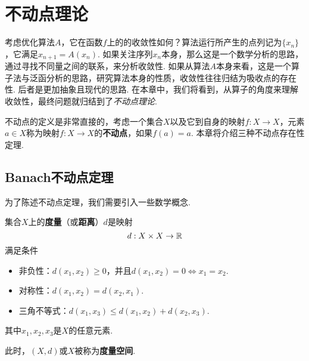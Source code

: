 \chapter{不动点理论}\label{chap:fixed-point-theory}

考虑优化算法$A$，它在函数$f$上的的收敛性如何？算法运行所产生的点列记为$\{x_n\}$，它满足$x_{n+1}=A(x_n)$. 如果关注序列$x_n$本身，那么这是一个数学分析的思路，通过寻找不同量之间的联系，来分析收敛性. 如果从算法$A$本身来看，这是一个算子法与泛函分析的思路，研究算法本身的性质，收敛性往往归结为吸收点的存在性. 后者是更加抽象且现代的思路. 在本章中，我们将看到，从算子的角度来理解收敛性，最终问题就归结到了\emph{不动点理论}. 

不动点的定义是非常直接的，考虑一个集合$X$以及它到自身的映射$f:X\to X$，元素$a\in X$称为映射$f:X\to X$的\textbf{不动点}，如果$f(a)=a$. 本章将介绍三种不动点存在性定理. 

\section{Banach不动点定理}
为了陈述不动点定理，我们需要引入一些数学概念. 

\begin{definition}[度量与度量空间]
集合$X$上的\textbf{度量}（或\textbf{距离}）$d$是映射
\[d:X\times X\to \mathbb{R}\]
满足条件
\begin{itemize}
\item 非负性：$d(x_1,x_2)\geq 0$，并且$d(x_1,x_2)=0\iff x_1=x_2$.
\item 对称性：$d(x_1,x_2)=d(x_2,x_1)$.
\item 三角不等式：$d(x_1,x_3)\le d(x_1,x_2)+d(x_2,x_3)$.
\end{itemize}
其中$x_1,x_2,x_3$是$X$的任意元素. 

此时，$(X,d)$或$X$被称为\textbf{度量空间}.
\end{definition}

